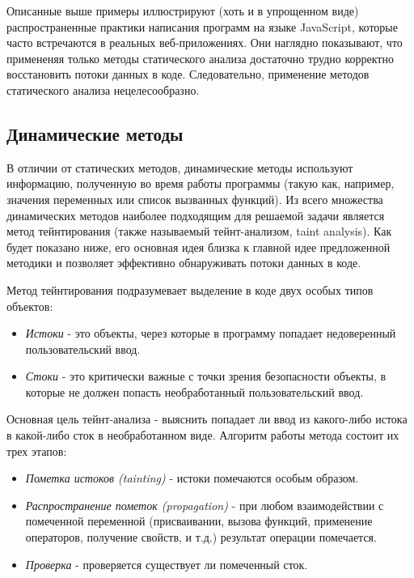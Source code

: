 	Описанные выше примеры иллюстрируют (хоть и в упрощенном виде) распространенные практики написания программ на языке JavaScript, которые часто встречаются в реальных веб-приложениях. Они наглядно показывают, что примененяя только методы статического анализа достаточно трудно корректно восстановить потоки данных в коде. Следовательно, применение методов статического анализа нецелесообразно.

\subsection{Динамические методы}
	В отличии от статических методов, динамические методы используют информацию, полученную во время работы программы (такую как, например, значения переменных или список вызванных функций). Из всего множества динамических методов наиболее подходящим для решаемой задачи является метод тейнтирования (также называемый тейнт-анализом, taint analysis). Как будет показано ниже, его основная идея близка к главной идее предложенной методики и позволяет эффективно обнаруживать потоки данных в коде.


	Метод тейнтирования подразумевает выделение в коде двух особых типов объектов:
	\begin{itemize}
		\item \textit{Истоки} - это объекты, через которые в программу попадает недоверенный пользовательский ввод.
		\item \textit{Стоки} - это критически важные с точки зрения безопасности объекты, в которые не должен попасть необработанный пользовательский ввод.
	\end{itemize}

	Основная цель тейнт-анализа - выяснить попадает ли ввод из какого-либо истока в какой-либо сток в необработанном виде. Алгоритм работы метода состоит их трех этапов:

	\begin{itemize}
		\item \textit{Пометка истоков (tainting)} - истоки помечаются особым образом.
		\item \textit{Распространение пометок (propagation)} - при любом взаимодействии с помеченной переменной (присваивании, вызова функций, применение операторов, получение свойств, и т.д.) результат операции помечается.
		\item \textit{Проверка} - проверяется существует ли помеченный сток.
	\end{itemize}


